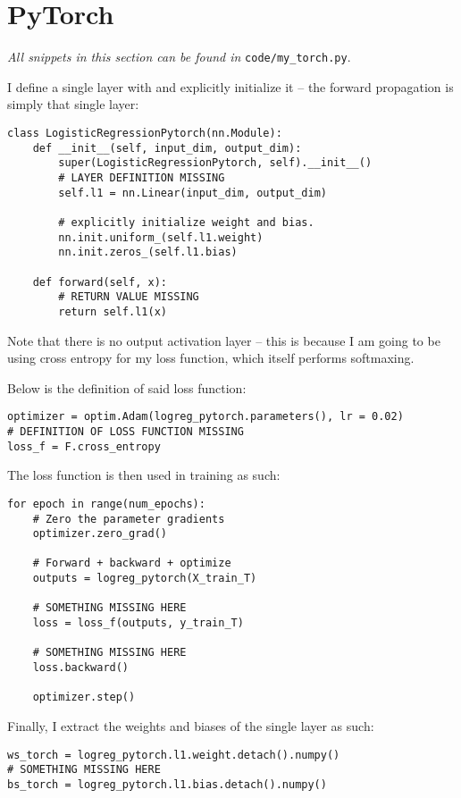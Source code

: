 \section{PyTorch}
\textit{All snippets in this section can be found in }\texttt{code/my\_torch.py}.

I define a single layer with and explicitly initialize it -- the forward
propagation is simply that single layer:

\begin{verbatim}
class LogisticRegressionPytorch(nn.Module):
    def __init__(self, input_dim, output_dim):
        super(LogisticRegressionPytorch, self).__init__()
        # LAYER DEFINITION MISSING
        self.l1 = nn.Linear(input_dim, output_dim)
        
        # explicitly initialize weight and bias.
        nn.init.uniform_(self.l1.weight)
        nn.init.zeros_(self.l1.bias)

    def forward(self, x):
        # RETURN VALUE MISSING
        return self.l1(x)
\end{verbatim}

Note that there is no output activation layer -- this is because I am going to
be using cross entropy for my loss function, which itself performs softmaxing.

Below is the definition of said loss function:

\begin{verbatim}
optimizer = optim.Adam(logreg_pytorch.parameters(), lr = 0.02)
# DEFINITION OF LOSS FUNCTION MISSING
loss_f = F.cross_entropy
\end{verbatim}

The loss function is then used in training as such:

\begin{verbatim}
for epoch in range(num_epochs):
    # Zero the parameter gradients
    optimizer.zero_grad()

    # Forward + backward + optimize
    outputs = logreg_pytorch(X_train_T)

    # SOMETHING MISSING HERE
    loss = loss_f(outputs, y_train_T)
    
    # SOMETHING MISSING HERE
    loss.backward()

    optimizer.step()
\end{verbatim}

Finally, I extract the weights and biases of the single layer as such:

\begin{verbatim}
ws_torch = logreg_pytorch.l1.weight.detach().numpy()
# SOMETHING MISSING HERE
bs_torch = logreg_pytorch.l1.bias.detach().numpy()
\end{verbatim}

\sectend
